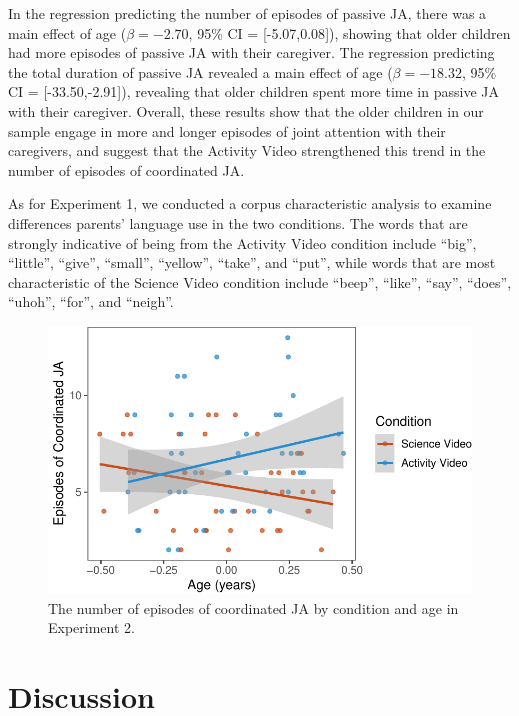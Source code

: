 \documentclass[man,floatsintext]{apa6}
\begin{document}
In the regression predicting the number of episodes of passive JA, there was a main effect of age (\(\beta=-2.70\), 95\% CI = {[}-5.07,0.08{]}), showing that older children had more episodes of passive JA with their caregiver.
The regression predicting the total duration of passive JA revealed a main effect of age (\(\beta=-18.32\), 95\% CI = {[}-33.50,-2.91{]}), revealing that older children spent more time in passive JA with their caregiver.
Overall, these results show that the older children in our sample engage in more and longer episodes of joint attention with their caregivers, and suggest that the Activity Video strengthened this trend in the number of episodes of coordinated JA.

As for Experiment 1, we conducted a corpus characteristic analysis to examine differences parents' language use in the two conditions.
The words that are strongly indicative of being from the Activity Video condition include \enquote{big}, \enquote{little}, \enquote{give}, \enquote{small}, \enquote{yellow}, \enquote{take}, and \enquote{put}, while words that are most characteristic of the Science Video condition include \enquote{beep}, \enquote{like}, \enquote{say}, \enquote{does}, \enquote{uhoh}, \enquote{for}, and \enquote{neigh}.

\begin{figure}[H]

{\centering \includegraphics{figs/e2ja-coord-1} 

}

\caption{The number of episodes of coordinated JA by condition and age in Experiment 2.}\label{fig:e2ja-coord}
\end{figure}

\hypertarget{discussion-1}{%
\section{Discussion}\label{discussion-1}}
\end{document}
